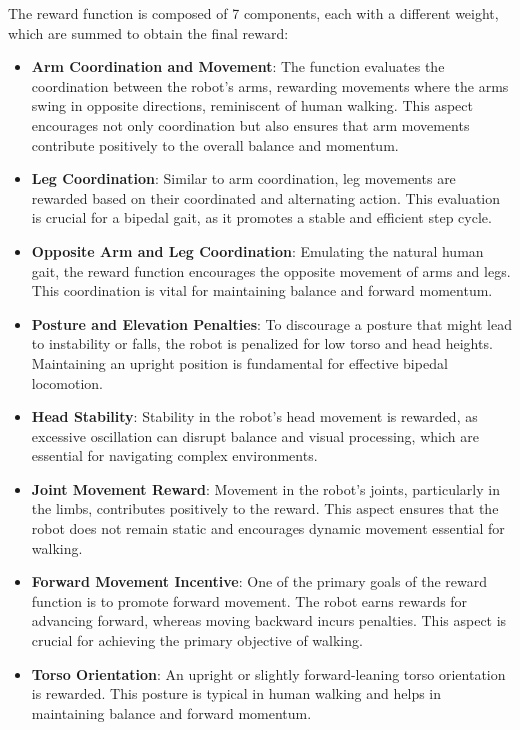 \documentclass[conference]{IEEEtran}
\begin{document}
The reward function is composed of 7 components, each with a different weight, which are summed to obtain the final reward:
\begin{itemize}
    \item \textbf{Arm Coordination and Movement}: The function evaluates the coordination between the robot's arms, rewarding movements where the arms swing in opposite directions,
          reminiscent of human walking. This aspect encourages not only coordination but also ensures that arm movements contribute positively to the overall balance and momentum.
    \item \textbf{Leg Coordination}: Similar to arm coordination, leg movements are rewarded based on their coordinated and alternating action. This evaluation is crucial for a bipedal gait, as it promotes a stable and efficient step cycle.
    \item \textbf{Opposite Arm and Leg Coordination}: Emulating the natural human gait, the reward function encourages the opposite movement of arms and legs. This coordination is vital for maintaining balance and forward momentum.
    \item \textbf{Posture and Elevation Penalties}: To discourage a posture that might lead to instability or falls, the robot is penalized for low torso and head heights. Maintaining an upright position is fundamental for effective bipedal locomotion.
    \item \textbf{Head Stability}: Stability in the robot's head movement is rewarded, as excessive oscillation can disrupt balance and visual processing, which are essential for navigating complex environments.
    \item \textbf{Joint Movement Reward}: Movement in the robot's joints, particularly in the limbs, contributes positively to the reward. This aspect ensures that the robot does not remain static and encourages dynamic movement essential for walking.
    \item \textbf{Forward Movement Incentive}: One of the primary goals of the reward function is to promote forward movement. The robot earns rewards for advancing forward, whereas moving backward incurs penalties. This aspect is crucial for achieving the primary objective of walking.
    \item \textbf{Torso Orientation}: An upright or slightly forward-leaning torso orientation is rewarded. This posture is typical in human walking and helps in maintaining balance and forward momentum.
\end{itemize}
\end{document}
